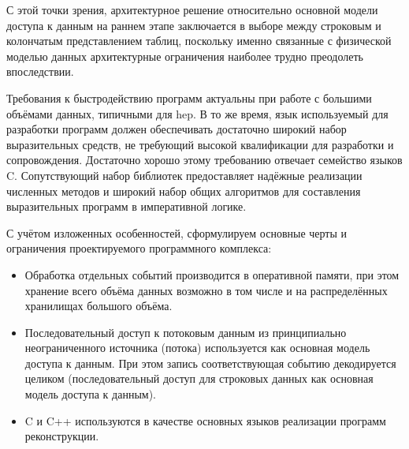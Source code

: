С этой точки зрения, архитектурное решение относительно основной модели
доступа к данным на раннем этапе заключается в выборе между строковым и
колончатым представлением таблиц, поскольку именно связанные с физической
моделью данных архитектурные  ограничения наиболее трудно преодолеть
впоследствии.

Требования к быстродействию программ актуальны при работе с большими
объёмами данных, типичными для \acrshort{hep}. В то же время, язык используемый для разработки программ должен обеспечивать достаточно широкий набор выразительных
средств, не требующий высокой квалификации для разработки и сопровождения.
Достаточно хорошо этому требованию отвечает семейство языков C. Сопутствующий
набор библиотек предоставляет надёжные реализации численных методов и
широкий набор общих алгоритмов для составления выразительных программ в
императивной логике.

С учётом изложенных особенностей, сформулируем основные черты и ограничения
проектируемого программного комплекса:
\begin{itemize}
    \item Обработка отдельных событий производится в оперативной памяти,
    при этом хранение всего объёма данных возможно в том числе и на
    распределённых хранилищах большого объёма.
    \item Последовательный доступ к потоковым данным из принципиально
    неограниченного источника (потока) используется как основная модель
    доступа к данным. При этом запись соответствующая событию декодируется
    целиком (последовательный доступ для строковых данных как основная
    модель доступа к данным).
    \item C и C++ используются в качестве основных языков реализации
    программ реконструкции.
\end{itemize}

